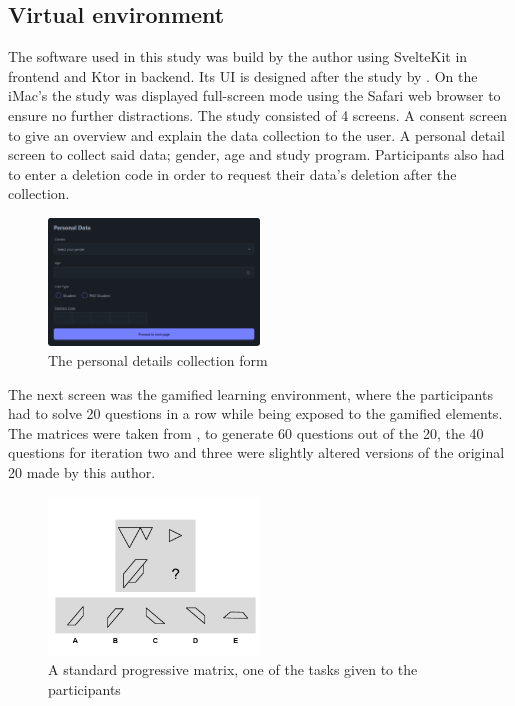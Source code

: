 \subsection{Virtual environment}
The software used in this study was build by the author using SvelteKit in frontend and Ktor in backend. Its UI is designed after the study by \textcite{albuquerqueDoesGenderStereotype2017}.
On the iMac's the study was displayed full-screen mode using the Safari web browser to ensure no further distractions. The study consisted of 4 screens.
A consent screen to give an overview and explain the data collection to the user.
A personal detail screen to collect said data; gender, age and study program. Participants also had to enter a deletion code in order to request their data's deletion after the collection.
\begin{figure}[H]
  \centering
  \includegraphics[width=0.5\textwidth]{img/details.png}
  \caption{The personal details collection form}
  \label{fig:figureDetails}
\end{figure}
The next screen was the gamified learning environment, where the participants had to solve 20 questions in a row while being exposed to the gamified elements.
The matrices were taken from \textcite{albuquerqueDoesGenderStereotype2017}, to generate 60 questions out of the 20, the 40 questions for iteration two and three were slightly altered versions of the original 20 made by this author.
\begin{figure}[H]
  \centering
  \includegraphics[width=0.5\textwidth]{img/q-17.png}
  \caption{A standard progressive matrix, one of the tasks given to the participants}
  \label{fig:figureMatrix}
\end{figure}
